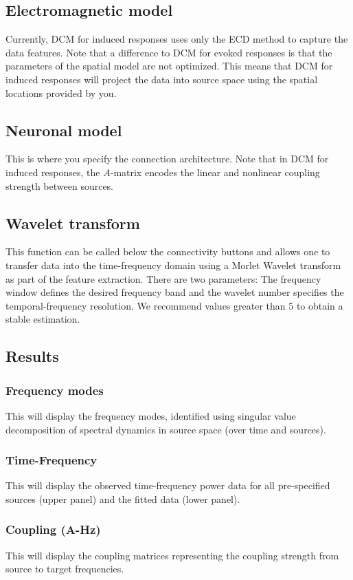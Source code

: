 \subsection{Electromagnetic model}
Currently, DCM for induced responses uses only the ECD method to capture the data features. Note that a difference to DCM for evoked responses is that the parameters of the spatial model are not optimized. This means that DCM for induced responses will project the data into source space using the spatial locations provided by you.


\subsection{Neuronal model}
This is where you specify the connection architecture. Note that in DCM for induced responses, the $A$-matrix encodes the linear and nonlinear coupling strength between sources.


\subsection{Wavelet transform}
This function can be called below the connectivity buttons and allows one to transfer data into the time-frequency domain using a Morlet Wavelet transform as part of the feature extraction.  There are two parameters: The frequency window defines the desired frequency band and the wavelet number specifies the temporal-frequency resolution. We recommend values greater than 5 to obtain a stable estimation.

\subsection{Results}

\subsubsection{Frequency modes}
This will display the frequency modes, identified using singular value decomposition of spectral dynamics in source space (over time and sources).

\subsubsection{Time-Frequency}
This will display the observed time-frequency power data for all pre-specified sources (upper panel) and the fitted data (lower panel).

\subsubsection{Coupling (A-Hz)}
This will display the coupling matrices representing the coupling strength from source to target frequencies.

